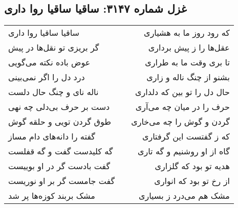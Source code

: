 \begin{center}
\section*{غزل شماره ۳۱۴۷: ساقیا ساقیا روا داری}
\label{sec:3147}
\begin{longtable}{l p{0.5cm} r}
ساقیا ساقیا روا داری
&&
که رود روز ما به هشیاری
\\
گر بریزی تو نقل‌ها در پیش
&&
عقل‌ها را ز پیش برداری
\\
عوض باده نکته می‌گویی
&&
تا بری وقت ما به طراری
\\
درد دل را اگر نمی‌بینی
&&
بشنو از چنگ ناله و زاری
\\
ناله نای و چنگ حال دلست
&&
حال دل را تو بین که دلداری
\\
دست بر حرف بی‌دلی چه نهی
&&
حرف را در میان چه می‌آری
\\
طوق گردن تویی و حلقه گوش
&&
گردن و گوش را چه می‌خاری
\\
گفته را دانه‌های دام مساز
&&
که ز گفتست این گرفتاری
\\
گه کلیدست گفت و گه قفلست
&&
گاه از او روشنیم و گه تاری
\\
گفت بادست گر در او بوییست
&&
هدیه تو بود که گلزاری
\\
گفت جامست گر بر او نوریست
&&
از رخ تو بود که انواری
\\
مشک بربند کوزه‌ها پر شد
&&
مشک هم می‌درد ز بسیاری
\\
\end{longtable}
\end{center}
